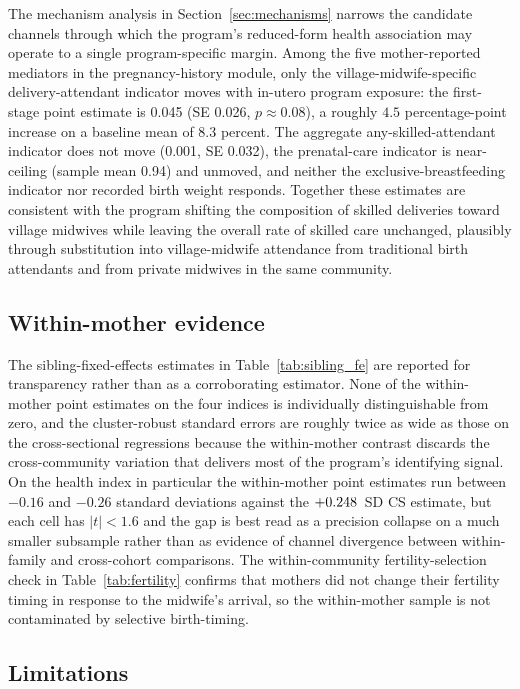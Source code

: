 The mechanism analysis in Section~\ref{sec:mechanisms} narrows the candidate channels through which the program's reduced-form health association may operate to a single program-specific margin. Among the five mother-reported mediators in the pregnancy-history module, only the village-midwife-specific delivery-attendant indicator moves with in-utero program exposure: the first-stage point estimate is \num{0.045} (SE \num{0.026}, $p \approx 0.08$), a roughly $4.5$ percentage-point increase on a baseline mean of $8.3$ percent. The aggregate any-skilled-attendant indicator does not move (\num{0.001}, SE \num{0.032}), the prenatal-care indicator is near-ceiling (sample mean \num{0.94}) and unmoved, and neither the exclusive-breastfeeding indicator nor recorded birth weight responds. Together these estimates are consistent with the program shifting the composition of skilled deliveries toward village midwives while leaving the overall rate of skilled care unchanged, plausibly through substitution into village-midwife attendance from traditional birth attendants and from private midwives in the same community.

\subsection{Within-mother evidence}

The sibling-fixed-effects estimates in Table~\ref{tab:sibling_fe} are reported for transparency rather than as a corroborating estimator. None of the within-mother point estimates on the four indices is individually distinguishable from zero, and the cluster-robust standard errors are roughly twice as wide as those on the cross-sectional regressions because the within-mother contrast discards the cross-community variation that delivers most of the program's identifying signal. On the health index in particular the within-mother point estimates run between $-0.16$ and $-0.26$ standard deviations against the $+0.248$~SD CS estimate, but each cell has $|t| < 1.6$ and the gap is best read as a precision collapse on a much smaller subsample rather than as evidence of channel divergence between within-family and cross-cohort comparisons. The within-community fertility-selection check in Table~\ref{tab:fertility} confirms that mothers did not change their fertility timing in response to the midwife's arrival, so the within-mother sample is not contaminated by selective birth-timing.

\subsection{Limitations}

